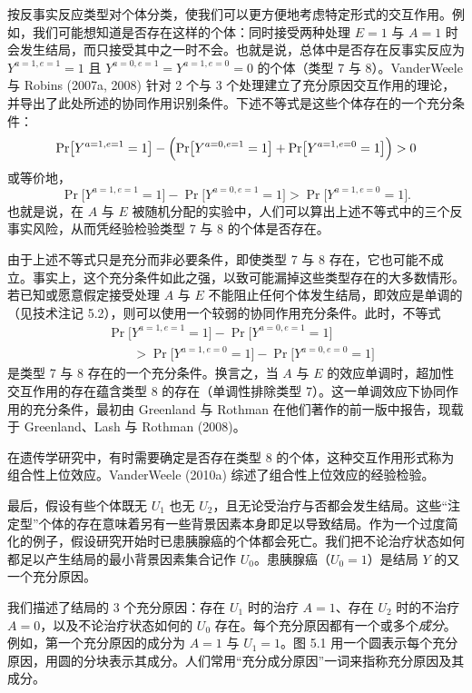 \renewcommand{\FPname}{精要（Fine Point）}
\begin{finepoint}[关于反事实类型与交互作用的补充]
按反事实反应类型对个体分类，使我们可以更方便地考虑特定形式的交互作用。例如，我们可能想知道是否存在这样的个体：同时接受两种处理 $E=1$ 与 $A=1$ 时会发生结局，而只接受其中之一时不会。也就是说，总体中是否存在反事实反应为 $Y^{a=1,e=1}=1$ 且 $Y^{a=0,e=1}=Y^{a=1,e=0}=0$ 的个体（类型 7 与 8）。VanderWeele 与 Robins (2007a, 2008) 针对 2 个与 3 个处理建立了充分原因交互作用的理论，并导出了此处所述的协同作用识别条件。下述不等式是这些个体存在的一个充分条件：
\[
\Pr\bigl[Y^{a=1,e=1}=1\bigr]-\Bigl(\Pr\bigl[Y^{a=0,e=1}=1\bigr]+\Pr\bigl[Y^{a=1,e=0}=1\bigr]\Bigr)>0
\]
或等价地，
\[
\Pr\bigl[Y^{a=1,e=1}=1\bigr]-\Pr\bigl[Y^{a=0,e=1}=1\bigr]>\Pr\bigl[Y^{a=1,e=0}=1\bigr].
\]
也就是说，在 $A$ 与 $E$ 被随机分配的实验中，人们可以算出上述不等式中的三个反事实风险，从而凭经验检验类型 7 与 8 的个体是否存在。

由于上述不等式只是充分而非必要条件，即使类型 7 与 8 存在，它也可能不成立。事实上，这个充分条件如此之强，以致可能漏掉这些类型存在的大多数情形。若已知或愿意假定接受处理 $A$ 与 $E$ 不能阻止任何个体发生结局，即效应是单调的（见技术注记 5.2），则可以使用一个较弱的协同作用充分条件。此时，不等式
\[
\begin{aligned}
&\Pr\bigl[Y^{a=1,e=1}=1\bigr]-\Pr\bigl[Y^{a=0,e=1}=1\bigr]\\
&\qquad>\Pr\bigl[Y^{a=1,e=0}=1\bigr]-\Pr\bigl[Y^{a=0,e=0}=1\bigr]
\end{aligned}
\]
是类型 7 与 8 存在的一个充分条件。换言之，当 $A$ 与 $E$ 的效应单调时，超加性交互作用的存在蕴含类型 8 的存在（单调性排除类型 7）。这一单调效应下协同作用的充分条件，最初由 Greenland 与 Rothman 在他们著作的前一版中报告，现载于 Greenland、Lash 与 Rothman (2008)。

在遗传学研究中，有时需要确定是否存在类型 8 的个体，这种交互作用形式称为组合性上位效应。VanderWeele (2010a) 综述了组合性上位效应的经验检验。
\end{finepoint}
\renewcommand{\FPname}{精要}

最后，假设有些个体既无 $U_1$ 也无 $U_2$，且无论受治疗与否都会发生结局。这些“注定型”个体的存在意味着另有一些背景因素本身即足以导致结局。作为一个过度简化的例子，假设研究开始时已患胰腺癌的个体都会死亡。我们把不论治疗状态如何都足以产生结局的最小背景因素集合记作 $U_0$。患胰腺癌（$U_0=1$）是结局 $Y$ 的又一个充分原因。


我们描述了结局的 3 个充分原因：存在 $U_1$ 时的治疗 $A=1$、存在 $U_2$ 时的不治疗 $A=0$，以及不论治疗状态如何的 $U_0$ 存在。每个充分原因都有一个或多个\emph{成分}。例如，第一个充分原因的成分为 $A=1$ 与 $U_1=1$。图 5.1 用一个圆表示每个充分原因，用圆的分块表示其成分。人们常用“充分成分原因”一词来指称充分原因及其成分。

